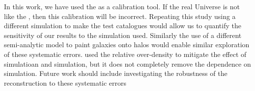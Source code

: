 \documentclass[useAMS,usenatbib,a4paper]{mn2e}
\begin{document}

In this work, we have used  the \MS as a calibration tool. If the real
Universe is not like the \MS, then this calibration will be incorrect.
Repeating this study using a different simulation to make the test catalogues
would allow us to quantify the sensitivity of our results to the simulation
used. Similarly the use of a different semi-analytic model to paint galaxies
onto halos would enable similar exploration of these systematic errors. 
\citet{SuyuEtal2010}
used the relative over-density to mitigate the effect of simulatioan and
simulation, but it does not completely remove the dependence on simulation.
 Future work should include
investigating the robustness of the reconstruction to these systematic errors 

\end{document}
